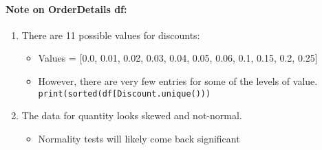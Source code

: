 \documentclass[11pt]{article}
\providecommand{\tightlist}{%
      \setlength{\itemsep}{0pt}\setlength{\parskip}{0pt}}
\begin{document}
    \begin{center}
    \end{center}
    { \hspace*{\fill} \\}
    
    \begin{center}
    \end{center}
    { \hspace*{\fill} \\}
    
    \begin{center}
    \end{center}
    { \hspace*{\fill} \\}
    
    \begin{center}
    \end{center}
    { \hspace*{\fill} \\}
    
    \begin{center}
    \end{center}
    { \hspace*{\fill} \\}
    
    \hypertarget{note-on-orderdetails-df}{%
\paragraph{Note on OrderDetails df:}\label{note-on-orderdetails-df}}

\begin{enumerate}
\def\labelenumi{\arabic{enumi}.}
\tightlist
\item
  There are 11 possible values for discounts:

  \begin{itemize}
  \tightlist
  \item
    Values = {[}0.0, 0.01, 0.02, 0.03, 0.04, 0.05, 0.06, 0.1, 0.15, 0.2,
    0.25{]}
  \item
    However, there are very few entries for some of the levels of value.
    \texttt{print(sorted(df{[}\textquotesingle{}Discount\textquotesingle{}{]}.unique()))}
  \end{itemize}
\item
  The data for quantity looks skewed and not-normal.

  \begin{itemize}
  \tightlist
  \item
    Normality tests will likely come back significant
  \end{itemize}
\end{enumerate}
\end{document}
